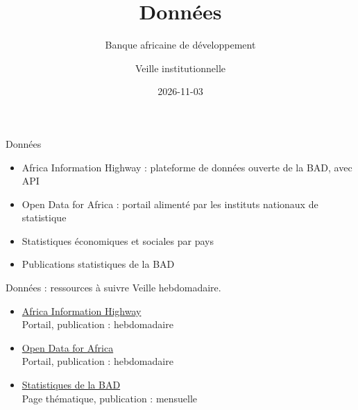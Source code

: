 \documentclass[aspectratio=169,11pt]{beamer}
\title{Données}
\subtitle{Banque africaine de développement}
\author{Veille institutionnelle}
\date{2026-11-03}
\begin{document}
\begin{frame}\titlepage\end{frame}

\begin{frame}{Données}
\begin{itemize}
\item Africa Information Highway : plateforme de données ouverte de la BAD, avec API
\item Open Data for Africa : portail alimenté par les instituts nationaux de statistique
\item Statistiques économiques et sociales par pays
\item Publications statistiques de la BAD
\end{itemize}
\end{frame}

\begin{frame}{Données : ressources à suivre}
\small
Veille hebdomadaire.
\begin{itemize}
\item \href{https://africaninfohighway.afdb.org}{Africa Information Highway}\\{\footnotesize Portail, publication : hebdomadaire}
\item \href{https://dataportal.opendataforafrica.org}{Open Data for Africa}\\{\footnotesize Portail, publication : hebdomadaire}
\item \href{https://www.afdb.org/en/knowledge/statistics}{Statistiques de la BAD}\\{\footnotesize Page thématique, publication : mensuelle}
\end{itemize}
\end{frame}
\end{document}
